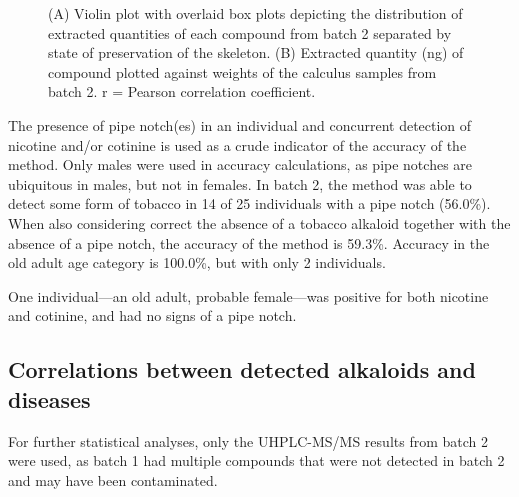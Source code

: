 \documentclass[
]{article}
\begin{document}
\begin{figure}


\caption{\label{fig-detection-preservation}(A) Violin plot with overlaid
box plots depicting the distribution of extracted quantities of each
compound from batch 2 separated by state of preservation of the
skeleton. (B) Extracted quantity (ng) of compound plotted against
weights of the calculus samples from batch 2. r = Pearson correlation
coefficient.}

\end{figure}%

The presence of pipe notch(es) in an individual and concurrent detection
of nicotine and/or cotinine is used as a crude indicator of the accuracy
of the method. Only males were used in accuracy calculations, as pipe
notches are ubiquitous in males, but not in females. In batch 2, the
method was able to detect some form of tobacco in 14 of 25 individuals
with a pipe notch (56.0\%). When also considering correct the absence of
a tobacco alkaloid together with the absence of a pipe notch, the
accuracy of the method is 59.3\%. Accuracy in the old adult age category
is 100.0\%, but with only 2 individuals.

One individual---an old adult, probable female---was positive for both
nicotine and cotinine, and had no signs of a pipe notch.

\subsection{Correlations between detected alkaloids and
diseases}\label{correlations-between-detected-alkaloids-and-diseases}

For further statistical analyses, only the UHPLC-MS/MS results from
batch 2 were used, as batch 1 had multiple compounds that were not
detected in batch 2 and may have been contaminated.
\end{document}
